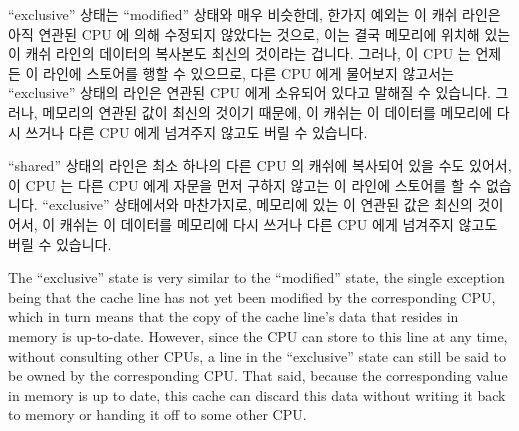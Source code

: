 \iffalse

MESI stands for ``modified'', ``exclusive'', ``shared'', and ``invalid'',
the four states a given cache line can take on using this
protocol.
Caches using this protocol therefore maintain a two-bit state ``tag'' on each
cache line in addition to that line's physical address and data.

A line in the ``modified'' state has been subject to a recent memory store
from the corresponding CPU, and the corresponding memory is guaranteed
not to appear in any other CPU's cache.
Cache lines in the ``modified'' state can thus be said to be ``owned''
by the CPU\@.
Because this cache holds the only up-to-date copy of the data, this
cache is ultimately responsible for either writing it back to memory
or handing it off to some other cache, and must do so before reusing
this line to hold other data.

\fi

``exclusive'' 상태는 ``modified'' 상태와 매우 비슷한데, 한가지 예외는 이 캐쉬
라인은 아직 연관된 CPU 에 의해 수정되지 않았다는 것으로, 이는 결국 메모리에
위치해 있는 이 캐쉬 라인의 데이터의 복사본도 최신의 것이라는 겁니다.
그러나, 이 CPU 는 언제든 이 라인에 스토어를 행할 수 있으므로, 다른 CPU 에게
물어보지 않고서는 ``exclusive'' 상태의 라인은 연관된 CPU 에게 소유되어 있다고
말해질 수 있습니다.
그러나, 메모리의 연관된 값이 최신의 것이기 때문에, 이 캐쉬는 이 데이터를
메모리에 다시 쓰거나 다른 CPU 에게 넘겨주지 않고도 버릴 수 있습니다.

``shared'' 상태의 라인은 최소 하나의 다른 CPU 의 캐쉬에 복사되어 있을 수도
있어서, 이 CPU 는 다른 CPU 에게 자문을 먼저 구하지 않고는 이 라인에 스토어를 할
수 없습니다.
``exclusive'' 상태에서와 마찬가지로, 메모리에 있는 이 연관된 값은 최신의
것이어서, 이 캐쉬는 이 데이터를 메모리에 다시 쓰거나 다른 CPU 에게 넘겨주지
않고도 버릴 수 있습니다.

\iffalse

The ``exclusive'' state is very similar to the ``modified'' state,
the single exception being that the cache line has not yet been
modified by the corresponding CPU, which in turn means that the
copy of the cache line's data that resides in memory is up-to-date.
However, since the CPU can store to this line at any time, without
consulting other CPUs, a line in the ``exclusive'' state can still
be said to be owned by the corresponding CPU\@.
That said, because the corresponding value in memory is up to date,
this cache can discard this data without writing it back to memory
or handing it off to some other CPU\@.

